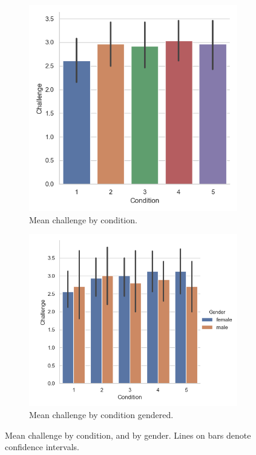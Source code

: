 \begin{figure}[H]
 \begin{subfigure}[b]{0.5\textwidth}
     \centering
     \includegraphics[scale=0.5]{Files/Plots/challenge_by_condition_mean.png}
     \caption{Mean challenge by condition.}
     \label{fig:meanChal}
 \end{subfigure}
  \begin{subfigure}[b]{0.5\textwidth}
     \centering
     \includegraphics[scale=0.5]{Files/Plots/challenge_by_condition_mean_gen.png}
     \caption{Mean challenge by condition gendered.}
     \label{fig:fig:meanChalGen}
 \end{subfigure}
     \caption{Mean challenge by condition, and by gender. Lines on bars denote confidence intervals.}
    \label{fig:chalByCond}
\end{figure}

